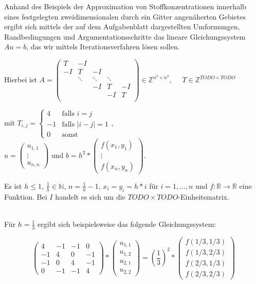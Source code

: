 \documentclass{article}
\begin{document}
Anhand des Beispiels der Approximation von Stoffkonzentrationen innerhalb eines festgelegten zweidimensionalen durch ein Gitter angenäherten Gebietes ergibt sich mittels der auf dem Aufgabenblatt dargestellten Umformungen, Randbedingungen und Argumentationsschritte das lineare Gleichungssystem $Au = b$, das wir mittels Iterationsverfahren lösen sollen.

Hierbei ist
$A = \begin{pmatrix}
T & -I &  &  &  \\ 
-I & T & -I &  &  \\ 
 & \ddots & \ddots & \ddots &  \\ 
 &  & -I & T & -I \\ 
 &  &  & -I & T \\ 
\end{pmatrix} \in \mathbb{Z}^{n^2 \times n^2}, \quad$
$T \in \mathbb{Z}^{TODO \times TODO}$ 

mit $T_{i,j} = \begin{cases} 4 & \text{falls } i = j \\ -1 & \text{falls } |i-j| = 1 \\ 0 & \text{sonst}\end{cases}, \quad$ 
$u = \begin{pmatrix}
u_{1,1} \\ 
\vdots \\
u_{n,n}
\end{pmatrix} \text{ und } b = h^2 * \begin{pmatrix}
f(x_1, y_1) \\ 
\vdots \\
f(x_n, y_n)
\end{pmatrix}.$

Es ist $h \leq 1$, $\frac{1}{h} \in \mathbb{N}$, $n = \frac{1}{h}-1$, $x_i = y_i = h*i$ für $i = 1, \ldots, n$ und $f : \mathbb{R} \to \mathbb{R}$ eine Funktion. Bei $I$ handelt es sich um die $TODO \times TODO$-Einheitsmatrix.

~\\

Für $h = \frac{1}{3}$ ergibt sich beispielsweise das folgende Gleichungssystem:

$$\begin{pmatrix}
4 & -1 & -1 & 0 \\ 
-1 & 4 & 0 & -1 \\ 
-1 & 0 & 4 & -1 \\ 
0 & -1 & -1 & 4
\end{pmatrix} *
\begin{pmatrix}
u_{1,1} \\ 
u_{1,2} \\ 
u_{2,1} \\ 
u_{2,2}
\end{pmatrix} = \left(\frac{1}{3}\right)^2 *
\begin{pmatrix}
f(1/3,1/3) \\ 
f(1/3,2/3) \\ 
f(2/3,1/3) \\ 
f(2/3,2/3)
\end{pmatrix}
$$
\end{document}
